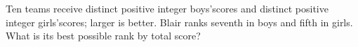 Ten teams receive distinct positive integer boys'scores and distinct positive integer girls'scores; larger is better. Blair ranks seventh in boys and fifth in girls. What is its best possible rank by total score?
